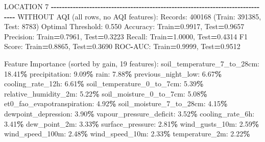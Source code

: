 \documentclass[
  letterpaper,
  DIV=11,
  numbers=noendperiod]{scrartcl}
\newenvironment{Shaded}{\begin{snugshade}}{\end{snugshade}}
\newcommand{\BuiltInTok}[1]{#1}
\newcommand{\DecValTok}[1]{\textcolor[rgb]{0.00,0.00,0.81}{#1}}
\newcommand{\FloatTok}[1]{\textcolor[rgb]{0.00,0.00,0.81}{#1}}
\newcommand{\NormalTok}[1]{#1}
\newcommand{\OperatorTok}[1]{\textcolor[rgb]{0.81,0.36,0.00}{\textbf{#1}}}
\begin{document}
\begin{Shaded}
\begin{Highlighting}[]
\NormalTok{LOCATION }\DecValTok{7}
\OperatorTok{{-}{-}{-}{-}{-}{-}{-}{-}{-}{-}{-}{-}{-}{-}{-}{-}{-}{-}{-}{-}{-}{-}{-}{-}{-}{-}{-}{-}{-}{-}{-}{-}{-}{-}{-}{-}{-}{-}{-}{-}{-}{-}{-}{-}{-}{-}{-}{-}{-}{-}{-}{-}{-}{-}{-}{-}{-}{-}{-}{-}{-}{-}{-}{-}{-}{-}{-}{-}{-}{-}{-}{-}{-}{-}{-}{-}{-}{-}{-}{-}}
\NormalTok{WITHOUT AQI (}\BuiltInTok{all}\NormalTok{ rows, no AQI features):}
\NormalTok{  Records: }\DecValTok{400168}\NormalTok{ (Train: }\DecValTok{391385}\NormalTok{, Test: }\DecValTok{8783}\NormalTok{)}
\NormalTok{  Optimal Threshold: }\FloatTok{0.550}
\NormalTok{  Accuracy: Train}\OperatorTok{=}\FloatTok{0.9917}\NormalTok{, Test}\OperatorTok{=}\FloatTok{0.9657}
\NormalTok{  Precision: Train}\OperatorTok{=}\FloatTok{0.7961}\NormalTok{, Test}\OperatorTok{=}\FloatTok{0.3223}
\NormalTok{  Recall: Train}\OperatorTok{=}\FloatTok{1.0000}\NormalTok{, Test}\OperatorTok{=}\FloatTok{0.4314}
\NormalTok{  F1 Score: Train}\OperatorTok{=}\FloatTok{0.8865}\NormalTok{, Test}\OperatorTok{=}\FloatTok{0.3690}
\NormalTok{  ROC}\OperatorTok{{-}}\NormalTok{AUC: Train}\OperatorTok{=}\FloatTok{0.9999}\NormalTok{, Test}\OperatorTok{=}\FloatTok{0.9512}

\NormalTok{  Feature Importance (}\BuiltInTok{sorted}\NormalTok{ by gain, }\DecValTok{19}\NormalTok{ features):}
\NormalTok{    soil\_temperature\_7\_to\_28cm: }\FloatTok{18.41}\OperatorTok{\%}
\NormalTok{    precipitation: }\FloatTok{9.09}\OperatorTok{\%}
\NormalTok{    rain: }\FloatTok{7.88}\OperatorTok{\%}
\NormalTok{    previous\_night\_low: }\FloatTok{6.67}\OperatorTok{\%}
\NormalTok{    cooling\_rate\_12h: }\FloatTok{6.61}\OperatorTok{\%}
\NormalTok{    soil\_temperature\_0\_to\_7cm: }\FloatTok{5.39}\OperatorTok{\%}
\NormalTok{    relative\_humidity\_2m: }\FloatTok{5.22}\OperatorTok{\%}
\NormalTok{    soil\_moisture\_0\_to\_7cm: }\FloatTok{5.08}\OperatorTok{\%}
\NormalTok{    et0\_fao\_evapotranspiration: }\FloatTok{4.92}\OperatorTok{\%}
\NormalTok{    soil\_moisture\_7\_to\_28cm: }\FloatTok{4.15}\OperatorTok{\%}
\NormalTok{    dewpoint\_depression: }\FloatTok{3.90}\OperatorTok{\%}
\NormalTok{    vapour\_pressure\_deficit: }\FloatTok{3.52}\OperatorTok{\%}
\NormalTok{    cooling\_rate\_6h: }\FloatTok{3.41}\OperatorTok{\%}
\NormalTok{    dew\_point\_2m: }\FloatTok{3.33}\OperatorTok{\%}
\NormalTok{    surface\_pressure: }\FloatTok{2.81}\OperatorTok{\%}
\NormalTok{    wind\_gusts\_10m: }\FloatTok{2.59}\OperatorTok{\%}
\NormalTok{    wind\_speed\_100m: }\FloatTok{2.48}\OperatorTok{\%}
\NormalTok{    wind\_speed\_10m: }\FloatTok{2.33}\OperatorTok{\%}
\NormalTok{    temperature\_2m: }\FloatTok{2.22}\OperatorTok{\%}


\end{Highlighting}
\end{Shaded}
\end{document}
